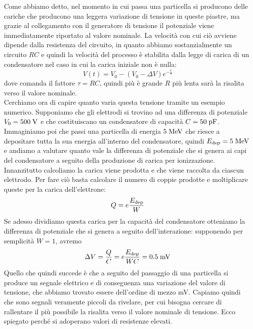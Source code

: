 \begin{esempio}
   Come abbiamo detto, nel momento in cui passa una particella si producono delle cariche che producono una leggera variazione di tensione in queste piastre, ma grazie al collegamento con il generatore di tensione il potenziale viene immediatamente riportato al valore nominale. La velocità con cui ciò avviene dipende dalla resistenza del circuito, in quanto abbiamo sostanzialmente un circuito $RC$ e quindi la velocità del processo è stabilita dalla legge di carica di un condensatore nel caso in cui la carica iniziale non è nulla:
   \begin{equation*}
      V(t)=V_0 - (V_0 - \Delta V) e^{-\frac{t}{\tau}}
   \end{equation*}
   dove comanda il fattore $\tau=RC$, quindi più è grande $R$ più lenta sarà la risalita verso il valore nominale.\\
   Cerchiamo ora di capire quanto varia questa tensione tramite un esempio numerico. Supponiamo che gli elettrodi si trovino ad una differenza di potenziale $V_0=500 \; \rm V$ e che costituiscano un condensatore di capacità $C=50 \; \rm pF$. Immaginiamo poi che passi una particella di energia $5 \; \rm MeV$ che riesce a depositare tutta la sua energia all'interno del condensatore, quindi $E_{\rm dep}=5 \; \rm MeV$ e andiamo a valutare quanto vale la differenza di potenziale che si genera ai capi del condensatore a seguito della produzione di carica per ionizzazione.\\
   Innanzitutto calcoliamo la carica viene prodotta e che viene raccolta da ciascun elettrodo. Per fare ciò basta calcolare il numero di coppie prodotte e moltiplicare queste per la carica dell'elettrone:
   \begin{equation*}
      Q=e\frac{E_{\rm dep}}{W}
   \end{equation*}
   Se adesso dividiamo questa carica per la capacità del condensatore otteniamo la differenza di potenziale che si genera a seguito dell'interazione: supponendo per semplicità $W=1$, avremo
   \begin{equation*}
      \Delta V
      =\frac{Q}{C}
      =e\frac{E_{\rm dep}}{WC}
      =0.5 \; \rm mV
   \end{equation*}
   Quello che quindi succede è che a seguito del passaggio di una particella si produce un segnale elettrico e di conseguenza una variazione del valore di tensione, che abbiamo trovato essere dell'ordine di mezzo mV. Capiamo quindi che sono segnali veramente piccoli da rivelare, per cui bisogna cercare di rallentare il più possibile la risalita verso il valore nominale di tensione. Ecco spiegato perché si adoperano valori di resistenze elevati.
\end{esempio}

